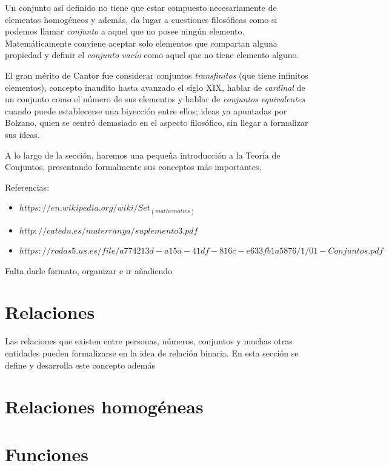 Un conjunto así definido no tiene que estar compuesto necesariamente
de elementos homogéneos y además, da lugar a cuestiones filosóficas como 
si podemos llamar \textit{conjunto} a aquel que no posee ningún elemento. 
Matemáticamente conviene aceptar solo elementos que compartan alguna 
propiedad y definir el \textit{conjunto vacío} como aquel que no tiene 
elemento alguno.

El gran mérito de Cantor fue considerar conjuntos \textit{transfinitos} 
(que tiene infinitos elementos), concepto inaudito hasta avanzado el siglo 
XIX, hablar de \textit{cardinal} de un conjunto como el número de sus
elementos y hablar de \textit{conjuntos equivalentes} cuando puede
establecerse una biyección entre ellos; ideas ya apuntadas por Bolzano,
quien se centró demasiado en el aspecto filosófico, sin llegar a formalizar
sus ideas.

A lo largo de la sección, haremos una pequeña introducción a la Teoría de 
Conjuntos, presentando formalmente sus conceptos más importantes.

\begin{comentario}
Referencias:
\begin{itemize}
\item $https://en.wikipedia.org/wiki/Set_(mathematics)$
\item $http://catedu.es/materranya/suplemento3.pdf$
\item $https://rodas5.us.es/file/a774213d-a15a-41df-816c-e633fb1a5876/1/01-Conjuntos.pdf$
\end{itemize}

Falta darle formato, organizar e ir añadiendo
\end{comentario}


\section{Relaciones}

Las relaciones que existen entre personas, números, conjuntos y muchas
otras entidades pueden formalizarse en la idea de relación binaria. En esta 
sección se define y desarrolla este concepto además 


\section{Relaciones homogéneas}


\section{Funciones}


